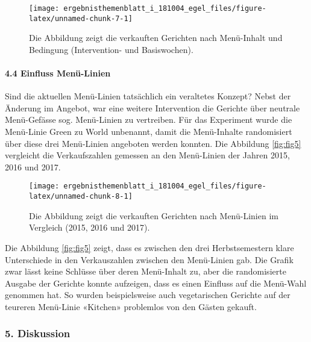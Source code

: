 \documentclass[12pt,ngerman,]{article}
\let\oldparagraph\paragraph
\renewcommand{\paragraph}[1]{\oldparagraph{#1}\mbox{}}
\begin{document}
\begin{figure}[H]

{\centering \texttt{[image: ergebnisthemenblatt\_i\_181004\_egel\_files/figure-latex/unnamed-chunk-7-1]} 

}

\caption{\label{fig:fig4} Die Abbildung zeigt die verkauften Gerichten nach Menü-Inhalt und Bedingung (Intervention- und Basiswochen).}\label{fig:unnamed-chunk-7}
\end{figure}

\hypertarget{einfluss-menu-linien}{%
\paragraph{4.4 Einfluss Menü-Linien}\label{einfluss-menu-linien}}

Sind die aktuellen Menü-Linien tatsächlich ein veraltetes Konzept? Nebst
der Änderung im Angebot, war eine weitere Intervention die Gerichte über
neutrale Menü-Gefässe sog. Menü-Linien zu vertreiben. Für das Experiment
wurde die Menü-Linie Green zu World unbenannt, damit die Menü-Inhalte
randomisiert über diese drei Menü-Linien angeboten werden konnten. Die
Abbildung \ref{fig:fig5} vergleicht die Verkaufszahlen gemessen an den
Menü-Linien der Jahren 2015, 2016 und 2017.

\begin{figure}[H]

{\centering \texttt{[image: ergebnisthemenblatt\_i\_181004\_egel\_files/figure-latex/unnamed-chunk-8-1]} 

}

\caption{\label{fig:fig5} Die Abbildung zeigt die verkauften Gerichten nach Menü-Linien im Vergleich (2015, 2016 und 2017).}\label{fig:unnamed-chunk-8}
\end{figure}

Die Abbildung \ref {fig:fig5} zeigt, dass es zwischen den drei
Herbstsemestern klare Unterschiede in den Verkauszahlen zwischen den
Menü-Linien gab. Die Grafik zwar lässt keine Schlüsse über deren
Menü-Inhalt zu, aber die randomisierte Ausgabe der Gerichte konnte
aufzeigen, dass es einen Einfluss auf die Menü-Wahl genommen hat. So
wurden beispielsweise auch vegetarischen Gerichte auf der teureren
Menü-Linie «Kitchen» problemlos von den Gästen gekauft.

\newpage

\hypertarget{diskussion}{%
\subsubsection{5. Diskussion}\label{diskussion}}
\end{document}
